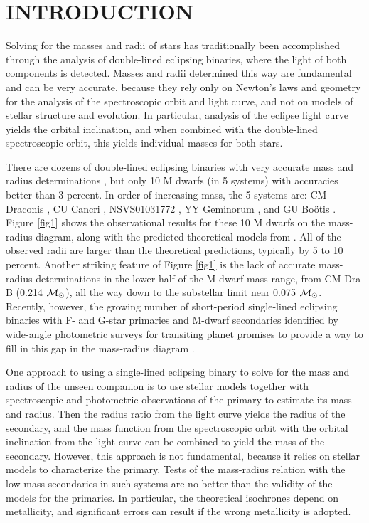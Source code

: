 \documentclass[12pt, preprint]{aastex}
\newcommand\msun{\ifmmode{{\cal M}_{\odot}}\else ${\cal M}_{\odot}$\fi}
\begin{document}

\section{INTRODUCTION}

Solving for the masses and radii of stars has traditionally been
accomplished through the analysis of double-lined eclipsing binaries,
where the light of both components is detected. Masses and radii
determined this way are fundamental and can be very accurate, because
they rely only on Newton's laws and geometry for the analysis of the
spectroscopic orbit and light curve, and not on models of stellar
structure and evolution. In particular, analysis of the eclipse light
curve yields the orbital inclination, and when combined with the
double-lined spectroscopic orbit, this yields individual masses for
both stars.

There are dozens of double-lined eclipsing binaries with very
accurate mass and radius determinations \citep[e.g. see][for a
review]{andersen1991}, but only 10 M dwarfs (in 5 systems) with
accuracies better than 3 percent. In order of increasing mass, the 5
systems are: CM Draconis \citep{lacy1977, metcalfe1996}, CU Cancri
\citep{ribas2003}, NSVS01031772 \citep{lopez2006}, YY Geminorum
\citep{torres2002}, and GU Bo\"{o}tis \citep{lopez2005}.  Figure
\ref{fig1} shows the observational results for these 10 M dwarfs on
the mass-radius diagram, along with the predicted theoretical models
from \cite{baraffe1998}. All of the observed radii are larger than the
theoretical predictions, typically by 5 to 10 percent. Another
striking feature of Figure \ref{fig1} is the lack of accurate
mass-radius determinations in the lower half of the M-dwarf mass
range, from CM Dra B (0.214 \msun), all the way down to the substellar
limit near 0.075 \msun. Recently, however, the growing number of
short-period single-lined eclipsing binaries with F- and G-star
primaries and M-dwarf secondaries identified by wide-angle photometric
surveys for transiting planet promises to provide a way to fill in this
gap in the mass-radius diagram \citep{bouchy2005, pont2005a,
pont2005b, pont2006}.

One approach to using a single-lined eclipsing binary to solve for the
mass and radius of the unseen companion is to use stellar models
together with spectroscopic and photometric observations of the
primary to estimate its mass and radius. Then the radius ratio from
the light curve yields the radius of the secondary, and the mass
function from the spectroscopic orbit with the orbital inclination
from the light curve can be combined to yield the mass of the
secondary. However, this approach is not fundamental, because it
relies on stellar models to characterize the primary. Tests of the
mass-radius relation with the low-mass secondaries in such systems are
no better than the validity of the models for the primaries. In
particular, the theoretical isochrones depend on metallicity, and
significant errors can result if the wrong metallicity is adopted.
\end{document}
